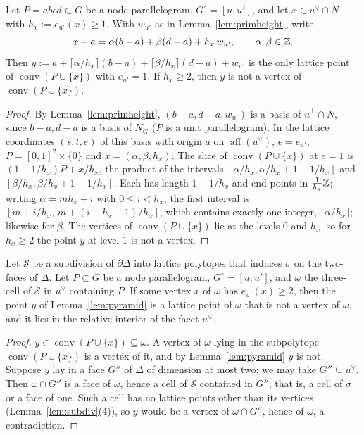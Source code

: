 \begin{lemma}\label{lem:pyramid}
Let $P=abcd\subset G$ be a node parallelogram, $G^\circ=[u,u']$, and let $x\in u^\vee\cap N$ with $h_x:=e_{u'}(x)\ge1$. With $w_{u'}$ as in
Lemma~\ref{lem:primheight}, write
\[
x-a=\alpha(b-a)+\beta(d-a)+h_x\,w_{u'},\qquad\alpha,\beta\in\mathbb Z.
\]
Then $y:=a+\lceil\alpha/h_x\rceil(b-a)+\lceil\beta/h_x\rceil(d-a)+w_{u'}$ is the only lattice point of $\operatorname{conv}(P\cup\{x\})$ with
$e_{u'}=1$. If $h_x\ge2$, then $y$ is not a vertex of $\operatorname{conv}(P\cup\{x\})$.
\end{lemma}

\begin{proof}
By Lemma~\ref{lem:primheight}, $(b-a,d-a,w_{u'})$ is a basis of $u^\perp\cap N$, since $b-a,d-a$ is a basis of $N_G$ ($P$ is a unit parallelogram).
In the lattice coordinates $(s,t,e)$ of this basis with origin $a$ on $\operatorname{aff}(u^\vee)$, $e=e_{u'}$, $P=[0,1]^2\times\{0\}$ and
$x=(\alpha,\beta,h_x)$. The slice of $\operatorname{conv}(P\cup\{x\})$ at $e=1$ is $(1-1/h_x)P+x/h_x$, the product of the intervals
$[\alpha/h_x,\alpha/h_x+1-1/h_x]$ and $[\beta/h_x,\beta/h_x+1-1/h_x]$. Each has length $1-1/h_x$ and end points in $\frac1{h_x}\mathbb Z$; writing
$\alpha=mh_x+i$ with $0\le i<h_x$, the first interval is $[m+i/h_x,\,m+(i+h_x-1)/h_x]$, which contains exactly one integer, $\lceil\alpha/h_x\rceil$;
likewise for $\beta$. The vertices of $\operatorname{conv}(P\cup\{x\})$ lie at the levels $0$ and $h_x$, so for $h_x\ge2$ the point $y$ at level $1$ is
not a vertex.
\end{proof}

\begin{lemma}\label{lem:hidden}
Let $\mathcal S$ be a subdivision of $\partial\Delta$ into lattice polytopes that induces $\sigma$ on the two-faces of $\Delta$. Let $P\subset G$ be a
node parallelogram, $G^\circ=[u,u']$, and $\omega$ the three-cell of $\mathcal S$ in $u^\vee$ containing $P$. If some vertex $x$ of $\omega$ has
$e_{u'}(x)\ge2$, then the point $y$ of Lemma~\ref{lem:pyramid} is a lattice point of $\omega$ that is not a vertex of $\omega$, and it lies in the
relative interior of the facet $u^\vee$.
\end{lemma}

\begin{proof}
$y\in\operatorname{conv}(P\cup\{x\})\subseteq\omega$. A vertex of $\omega$ lying in the subpolytope $\operatorname{conv}(P\cup\{x\})$ is a vertex of it,
and by Lemma~\ref{lem:pyramid} $y$ is not. Suppose $y$ lay in a face $G''$ of $\Delta$ of dimension at most two; we may take $G''\subseteq u^\vee$.
Then $\omega\cap G''$ is a face of $\omega$, hence a cell of $\mathcal S$ contained in $G''$, that is, a cell of $\sigma$ or a face of one. Such a cell
has no lattice points other than its vertices (Lemma~\ref{lem:subdiv}(4)), so $y$ would be a vertex of $\omega\cap G''$, hence of $\omega$, a
contradiction.
\end{proof}

